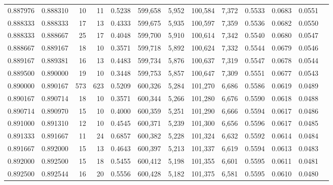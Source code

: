 \begin{tabular}{rrrrrrrrrrrrr}
0.887976 & 0.888310 &    10 &  11 &                                     0.5238 & 599,658 &   5,952 & 100,584 &   7,372 & 0.5533 & 0.0683 & 0.0551 \\
0.888333 & 0.888333 &    17 &  13 &                                     0.4333 & 599,675 &   5,935 & 100,597 &   7,359 & 0.5536 & 0.0682 & 0.0550 \\
0.888333 & 0.888667 &    25 &  17 &                                     0.4048 & 599,700 &   5,910 & 100,614 &   7,342 & 0.5540 & 0.0680 & 0.0547 \\
0.888667 & 0.889167 &    18 &  10 &                                     0.3571 & 599,718 &   5,892 & 100,624 &   7,332 & 0.5544 & 0.0679 & 0.0546 \\
0.889167 & 0.889381 &    16 &  13 &                                     0.4483 & 599,734 &   5,876 & 100,637 &   7,319 & 0.5547 & 0.0678 & 0.0544 \\
0.889500 & 0.890000 &    19 &  10 &                                     0.3448 & 599,753 &   5,857 & 100,647 &   7,309 & 0.5551 & 0.0677 & 0.0543 \\
0.890000 & 0.890167 &   573 & 623 &                                     0.5209 & 600,326 &   5,284 & 101,270 &   6,686 & 0.5586 & 0.0619 & 0.0489 \\
0.890167 & 0.890714 &    18 &  10 &                                     0.3571 & 600,344 &   5,266 & 101,280 &   6,676 & 0.5590 & 0.0618 & 0.0488 \\
0.890714 & 0.890970 &    15 &  10 &                                     0.4000 & 600,359 &   5,251 & 101,290 &   6,666 & 0.5594 & 0.0617 & 0.0486 \\
0.891000 & 0.891310 &    12 &  10 &                                     0.4545 & 600,371 &   5,239 & 101,300 &   6,656 & 0.5596 & 0.0617 & 0.0485 \\
0.891333 & 0.891667 &    11 &  24 &                                     0.6857 & 600,382 &   5,228 & 101,324 &   6,632 & 0.5592 & 0.0614 & 0.0484 \\
0.891667 & 0.892000 &    15 &  13 &                                     0.4643 & 600,397 &   5,213 & 101,337 &   6,619 & 0.5594 & 0.0613 & 0.0483 \\
0.892000 & 0.892500 &    15 &  18 &                                     0.5455 & 600,412 &   5,198 & 101,355 &   6,601 & 0.5595 & 0.0611 & 0.0481 \\
0.892500 & 0.892544 &    16 &  20 &                                     0.5556 & 600,428 &   5,182 & 101,375 &   6,581 & 0.5595 & 0.0610 & 0.0480 \\

\end{tabular}

